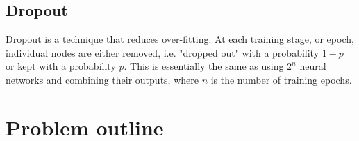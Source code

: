 \subsection{Dropout}
Dropout is a technique that reduces over-fitting. At each training stage, or epoch, individual nodes are either removed, i.e. "dropped out" with a probability $1-p$ or kept with a probability $p$. This is essentially the same as using $2^n$ neural networks and combining their outputs, where $n$ is the number of training epochs. 

\section{Problem outline}
